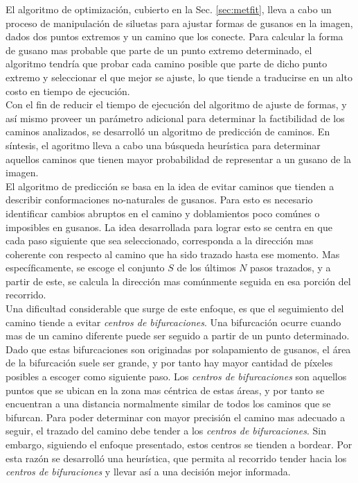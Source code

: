 El algoritmo de optimizaci\'on, cubierto en la Sec. \ref{sec:metfit}, lleva a cabo un
proceso de manipulaci\'on de siluetas para ajustar formas de gusanos en la imagen, dados
dos puntos extremos y un camino que los conecte. Para calcular la forma de gusano mas probable
que parte de un punto extremo determinado, el algoritmo tendr\'ia que probar cada camino posible
que parte de dicho punto extremo y seleccionar el que mejor se ajuste, lo que tiende a traducirse  
en un alto costo en tiempo de ejecuci\'on.\\
Con el fin de reducir el tiempo de ejecuci\'on del algoritmo de ajuste de
formas, y as\'i mismo proveer un par\'ametro adicional para determinar la
factibilidad de los caminos analizados, se desarroll\'o un algoritmo de
predicci\'on de caminos. En s\'intesis, el agoritmo lleva a cabo una b\'usqueda
heur\'istica para determinar aquellos caminos que tienen mayor probabilidad
de representar a un gusano de la imagen.\\

El algoritmo de predicci\'on se basa en la idea de evitar caminos que
tienden a describir conformaciones no-naturales de gusanos. Para esto
es necesario identificar cambios abruptos en el camino y doblamientos
poco com\'unes o imposibles en gusanos. La idea desarrollada para lograr
esto se centra en que cada paso siguiente que sea seleccionado, corresponda
a la direcci\'on mas coherente con respecto al camino que ha sido
trazado hasta ese momento. 
Mas espec\'ificamente, se escoge el conjunto $S$ de los \'ultimos $N$ 
pasos trazados, y a partir de este, se calcula la direcci\'on mas com\'unmente
seguida en esa porci\'on del recorrido.\\

Una dificultad considerable que surge de este
enfoque, es que el seguimiento del camino tiende a evitar \emph{centros de bifurcaciones}.
Una bifurcaci\'on ocurre cuando mas de un camino diferente puede ser seguido a partir
de un punto determinado. Dado que estas bifurcaciones son originadas por solapamiento 
de gusanos, el \'area de la bifurcaci\'on suele ser grande, y por tanto hay mayor 
cantidad de p\'ixeles posibles a escoger como siguiente paso. Los \emph{centros de bifurcaciones}
son aquellos puntos que se ubican en la zona mas c\'entrica de estas \'areas, y por tanto
se encuentran a una distancia normalmente similar de todos los caminos que se bifurcan.
Para poder determinar con mayor precisi\'on el camino mas adecuado a seguir, el trazado del camino 
debe tender a los \emph{centros de bifurcaciones}. Sin embargo, siguiendo el enfoque presentado, estos
centros se tienden a bordear. Por esta raz\'on se desarroll\'o una heur\'istica, que permita
al recorrido tender hacia los \emph{centros de bifuraciones} y llevar as\'i a una 
decisi\'on mejor informada.\\

